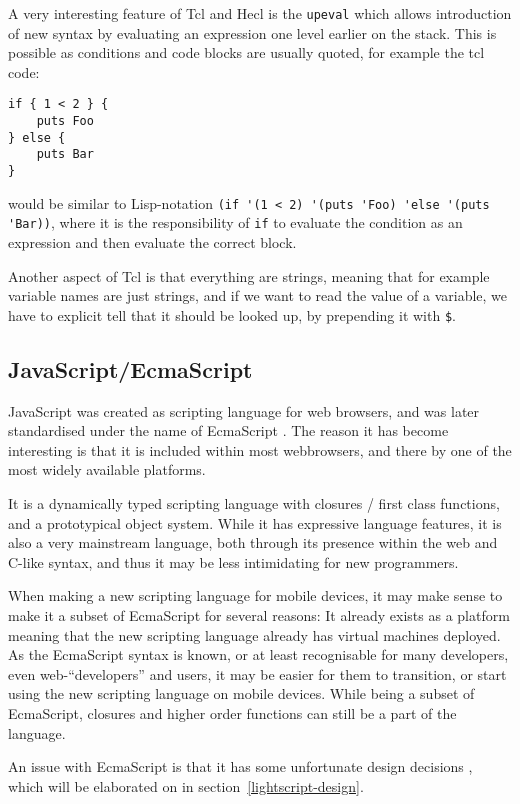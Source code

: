 \documentclass[11pt]{report}
\begin{document}
A very interesting feature of Tcl and Hecl is the \verb|upeval| which allows introduction of new syntax by evaluating an expression one level earlier on the stack. 
This is possible as conditions and code blocks are usually quoted, for example the tcl code:
\begin{verbatim}
if { 1 < 2 } {
    puts Foo
} else {
    puts Bar
}
\end{verbatim}
would be similar to Lisp-notation \verb|(if '(1 < 2) '(puts 'Foo) 'else '(puts 'Bar))|, where it is the responsibility of \verb|if| to evaluate the condition as an expression and then evaluate the correct block. 

Another aspect of Tcl is that everything are strings, meaning that for example variable names are just strings, and if we want to read the value of a variable, we have to explicit tell that it should be looked up, by prepending it with \verb|$|.

\subsection{JavaScript/EcmaScript}
\label{JavaScript}
JavaScript was created as scripting language for web browsers, and was later standardised under the name of EcmaScript \cite{ecma-262}.
The reason it has become interesting is that it is included within most webbrowsers, and there by one of the most widely available platforms.

It is a dynamically typed scripting language with closures / first class functions, and a prototypical object system.
While it has expressive language features, it is also a very mainstream language, both through its presence within the web and C-like syntax, and thus it may be less intimidating for new programmers.

When making a new scripting language for mobile devices, it may make sense to make it a subset of EcmaScript for several reasons: It already exists as a platform meaning that the new scripting language already has virtual machines deployed. As the EcmaScript syntax is known, or at least recognisable for many developers, even web-``developers'' and users, it may be easier for them to transition, or start using the new scripting language on mobile devices. While being a subset of EcmaScript, closures and higher order functions can still be a part of the language.

An issue with EcmaScript is that it has some unfortunate design decisions \cite{crockford-web}, which will be elaborated on in section~\ref{lightscript-design}.
\end{document}
